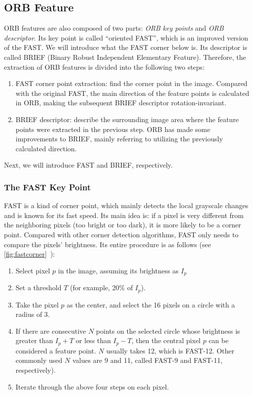 \subsection{ORB Feature}

ORB features are also composed of two parts: \textit{ORB key points} and \textit{ORB descriptor}. Its key point is called ``oriented FAST'', which is an improved version of the FAST. We will introduce what the FAST corner below is. Its descriptor is called BRIEF (Binary Robust Independent Elementary Feature). Therefore, the extraction of ORB features is divided into the following two steps:
\begin{enumerate}
\item FAST corner point extraction: find the corner point in the image. Compared with the original FAST, the main direction of the feature points is calculated in ORB, making the subsequent BRIEF descriptor rotation-invariant.
\item BRIEF descriptor: describe the surrounding image area where the feature points were extracted in the previous step. ORB has made some improvements to BRIEF, mainly referring to utilizing the previously calculated direction.
\end{enumerate}

Next, we will introduce FAST and BRIEF, respectively.

\subsubsection{The FAST Key Point}
FAST is a kind of corner point, which mainly detects the local grayscale changes and is known for its fast speed. Its main idea is: if a pixel is very different from the neighboring pixels (too bright or too dark), it is more likely to be a corner point. Compared with other corner detection algorithms, FAST only needs to compare the pixels' brightness. Its entire procedure is as follows (see \autoref{fig:fastcorner}~):

\begin{enumerate}
\item Select pixel $p$ in the image, assuming its brightness as $I_{p}$
\item Set a threshold $T$ (for example, 20\% of $I_{p}$).
\item Take the pixel $p$ as the center, and select the 16 pixels on a circle with a radius of 3.
\item If there are consecutive $N$ points on the selected circle whose brightness is greater than $I_{p}+T$ or less than $I_{p}-T$, then the central pixel $p$ can be considered a feature point. $N$ usually takes 12, which is FAST-12. Other commonly used $N$ values are 9 and 11, called FAST-9 and FAST-11, respectively).
\item Iterate through the above four steps on each pixel.
\end{enumerate}

